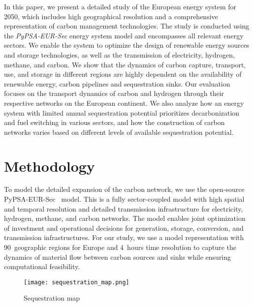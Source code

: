 \documentclass[conference]{IEEEtran}
\begin{document}
In this paper, we present a detailed study of the European energy system for 2050, which includes high geographical resolution and a comprehensive representation of carbon management technologies. The study is conducted using the \textit{PyPSA-EUR-Sec} energy system model and encompasses all relevant energy sectors. We enable the system to optimize the design of renewable energy sources and storage technologies, as well as the transmission of electricity, hydrogen, methane, and carbon. We show that the dynamics of carbon capture, transport, use, and storage in different regions are highly dependent on the availability of renewable energy, carbon pipelines and sequestration sinks. Our evaluation focuses on the transport dynamics of carbon and hydrogen through their respective networks on the European continent. We also analyze how an energy system with limited annual sequestration potential prioritizes decarbonization and fuel switching in various sectors, and how the construction of carbon networks varies based on different levels of available sequestration potential.


\section{Methodology}
\label{sec:methodology}

To model the detailed expansion of the carbon network, we use the open-source PyPSA-EUR-Sec~\cite{PyPSAEurSecSectorCoupledOpen2023} model. This is a fully sector-coupled model with high spatial and temporal resolution and detailed transmission infrastructure for electricity, hydrogen, methane, and carbon networks. The model enables joint optimization of investment and operational decisions for generation, storage, conversion, and transmission infrastructures. For our study, we use a model representation with 90~geographic regions for Europe and 4~hours time resolution to capture the dynamics of material flow between carbon sources and sinks while ensuring computational feasibility.

\begin{figure}
    \centering
    \texttt{[image: sequestration\_map.png]}
    \caption{Sequestration map}
    \label{fig:sequestration_map}
\end{figure}
\end{document}
